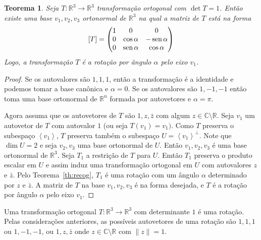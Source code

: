 \documentclass[12pt]{amsart}
\newcommand{\C}{\mathbb C}
\newcommand{\R}{\mathbb R}
\DeclareMathOperator{\sen}{\textrm{\rm sen}}
\newtheorem{theorem}{Teorema}
\theoremstyle{definition}
\begin{document}
\begin{theorem}
    Seja $T:\R^3\to\R^3$ transformação ortogonal com $\det T=1$. 
    Então existe uma base $v_1,v_2,v_3$ ortonormal de $\R^3$ na qual a matriz de $T$ está na forma 
    \[
        [T]=\begin{pmatrix} 1 & 0 & 0\\ 0 & \cos\alpha & -\sen\alpha \\ 0 & 
            \sen\alpha & \cos\alpha\end{pmatrix}
    \]
    Logo, a transformação $T$ é a rotação por ângulo $\alpha$ pelo eixo $v_1$.
\end{theorem}
\begin{proof}
    Se os autovalores são $1,1,1$, então a transformação é a identidade e podemos tomar a base canônica e $\alpha=0$. Se os autovalores são $1,-1,-1$ então toma uma base ortonormal de $\R^n$ formada por autovetores e $\alpha=\pi$. 

    Agora assuma que os autovetores de $T$ são $1,z,\bar z$ com algum $z\in\C\setminus\R$.  
    Seja $v_1$ um autovetor de $T$ com autovalor $1$ (ou seja $T(v_1)=v_1)$. Como $T$ preserva o subespaço 
    $\left<v_1\right>$, $T$ preserva também o subespaço $U=\left<v_1\right>^\perp$. Note que $\dim U=2$ e 
    seja $v_2,v_3$ uma base ortonormal
    de $U$. Então $v_1,v_2,v_3$ é uma base ortonormal de $\R^3$. 
    Seja $T_1$ a restrição de $T$ para $U$. Emtão $T_1$ preserva o produto escalar em 
    $U$ e assim induz uma transformação ortogonal em $U$ com autovalores $z$ e $\bar z$. Pelo 
    Teorema~\ref{th:recog}, $T_1$ é uma rotação com um ângulo $\alpha$ determinado por $z$ e $\bar z$. 
    A matriz de $T$ na base $v_1,v_2,v_3$ é na forma desejada, e $T$ é a rotação por ângulo $\alpha$ pelo eixo $v_1$.
\end{proof}


Uma transformação ortogonal $T:\R^3\to\R^3$ com determinante $1$ é uma rotação. Pelas 
considerações anteriores, as possíveis autovetores de uma rotação são $1,1,1$ ou  
$1,-1,-1$, ou $1,z,\bar z$ onde 
$z\in\C\setminus\R$ com $\|z\|=1$.
\end{document}
